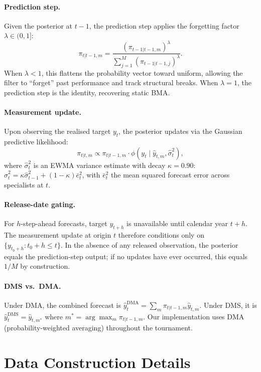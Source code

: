 \documentclass[11pt,a4paper]{article}
\begin{document}
\paragraph{Prediction step.} Given the posterior at $t{-}1$, the prediction step applies the forgetting factor $\lambda \in (0, 1]$:
\[
\pi_{t|t-1, m} = \frac{(\pi_{t-1|t-1, m})^\lambda}{\sum_{j=1}^M (\pi_{t-1|t-1, j})^\lambda}.
\]
When $\lambda < 1$, this flattens the probability vector toward uniform, allowing the filter to ``forget'' past performance and track structural breaks. When $\lambda = 1$, the prediction step is the identity, recovering static BMA.

\paragraph{Measurement update.} Upon observing the realised target $y_t$, the posterior updates via the Gaussian predictive likelihood:
\[
\pi_{t|t, m} \propto \pi_{t|t-1, m} \cdot \phi(y_t \mid \hat{y}_{t,m}, \hat{\sigma}^2_t),
\]
where $\hat{\sigma}^2_t$ is an EWMA variance estimate with decay $\kappa = 0.90$:
$\hat{\sigma}^2_t = \kappa \hat{\sigma}^2_{t-1} + (1 - \kappa) \bar{e}^2_t$, with $\bar{e}^2_t$ the mean squared forecast error across specialists at $t$.

\paragraph{Release-date gating.} For $h$-step-ahead forecasts, target $y_{t+h}$ is unavailable until calendar year $t + h$. The measurement update at origin $t$ therefore conditions only on $\{y_{t_0 + h} : t_0 + h \le t\}$. In the absence of any released observation, the posterior equals the prediction-step output; if no updates have ever occurred, this equals $1/M$ by construction.

\paragraph{DMS vs.\ DMA.} Under DMA, the combined forecast is $\hat{y}_t^{\text{DMA}} = \sum_m \pi_{t|t-1,m} \hat{y}_{t,m}$. Under DMS, it is $\hat{y}_t^{\text{DMS}} = \hat{y}_{t, m^*}$ where $m^* = \arg\max_m \pi_{t|t-1,m}$. Our implementation uses DMA (probability-weighted averaging) throughout the tournament.


\section{Data Construction Details}
\label{app:data}
\end{document}
